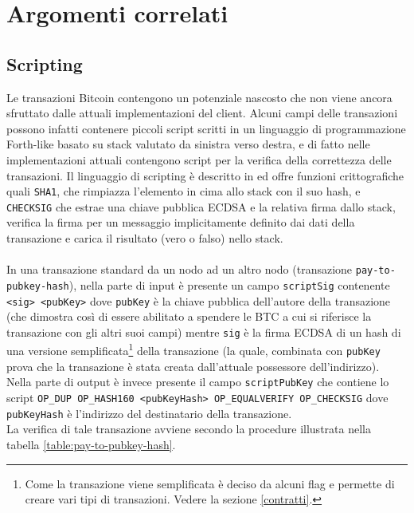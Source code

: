 \chapter{Argomenti correlati}

\section{Scripting}\label{transaction-scripting}

Le transazioni Bitcoin contengono un potenziale nascosto che non viene ancora sfruttato dalle attuali implementazioni del client.
Alcuni campi delle transazioni possono infatti contenere piccoli script scritti in un linguaggio di programmazione Forth-like basato su stack valutato da sinistra verso destra, e di fatto nelle implementazioni attuali contengono script per la verifica della correttezza delle transazioni. Il linguaggio di scripting è descritto in \cite{bitcoin-scripting-api} ed offre funzioni crittografiche quali \verb|SHA1|, che rimpiazza l'elemento in cima allo stack con il suo hash, e \verb|CHECKSIG| che estrae una chiave pubblica ECDSA e la relativa firma dallo stack, verifica la firma per un messaggio implicitamente definito dai dati della transazione e carica il risultato (vero o falso) nello stack.\\\\
In una transazione standard da un nodo ad un altro nodo (transazione \verb|pay-to-pubkey-hash|), nella parte di input è presente un campo \verb|scriptSig| contenente \verb|<sig> <pubKey>| dove \verb|pubKey| è la chiave pubblica dell'autore della transazione (che dimostra così di essere abilitato a spendere le BTC a cui si riferisce la transazione con gli altri suoi campi) mentre \verb|sig| è la firma ECDSA di un hash di una versione semplificata\footnote{Come la transazione viene semplificata è deciso da alcuni flag e permette di creare vari tipi di transazioni. Vedere la sezione \ref{contratti}.} della transazione (la quale, combinata con \verb|pubKey| prova che la transazione è stata creata dall'attuale possessore dell'indirizzo).
Nella parte di output è invece presente il campo \verb|scriptPubKey| che contiene lo script \verb|OP_DUP OP_HASH160 <pubKeyHash> OP_EQUALVERIFY OP_CHECKSIG| dove \verb|pubKeyHash| è l'indirizzo del destinatario della transazione.\\
La verifica di tale transazione avviene secondo la procedure illustrata nella tabella \ref{table:pay-to-pubkey-hash}.

